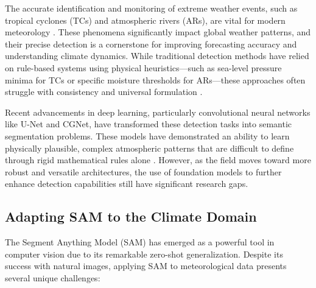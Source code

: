 The accurate identification and monitoring of extreme weather events, such as tropical cyclones (TCs) and atmospheric rivers (ARs), are vital for modern meteorology  \cite{hewson2010objective, hengstebeck2018radar, dawe2012statistical, lawrence2018characterizing, rautenhaus2017visualization, beckert2023three}. These phenomena significantly impact global weather patterns, and their precise detection is a cornerstone for improving forecasting accuracy and understanding climate dynamics. While traditional detection methods have relied on rule-based systems using physical heuristics—such as sea-level pressure minima for TCs or specific moisture thresholds for ARs—these approaches often struggle with consistency and universal formulation  \cite{neu2013imilast, bourdin2022intercomparison, guan2015detection, shields2018atmospheric}.

Recent advancements in deep learning, particularly convolutional neural networks like U-Net and CGNet, have transformed these detection tasks into semantic segmentation problems. These models have demonstrated an ability to learn physically plausible, complex atmospheric patterns that are difficult to define through rigid mathematical rules alone \cite{boukabara2021outlook, higgins2023using}. However, as the field moves toward more robust and versatile architectures, the use of foundation models to further enhance detection capabilities still have significant research gaps.

\subsection{Adapting SAM to the Climate Domain}

The Segment Anything Model (SAM) has emerged as a powerful tool in computer vision due to its remarkable zero-shot generalization. Despite its success with natural images, applying SAM to meteorological data presents several unique challenges:

